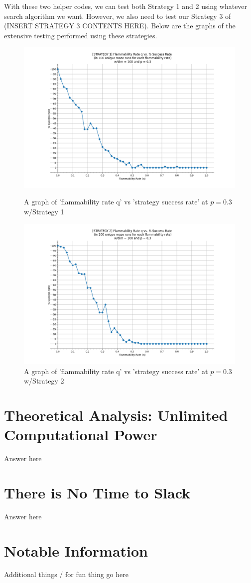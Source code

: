 \documentclass[11pt]{article}
\begin{document}
With these two helper codes, we can test both Strategy 1 and 2 using whatever search algorithm we want. However, we also need to test our Strategy 3 of (INSERT STRATEGY 3 CONTENTS HERE). Below are the graphs of the extensive testing performed using these strategies.
\begin{figure}[!]
\centering
\includegraphics[scale=0.50]{Strategy1_q_successRate.PNG}
\caption{A graph of 'flammability rate q' vs 'strategy success rate' at $p = 0.3$ w/Strategy 1}
\includegraphics[scale=0.50]{Strategy2_q_successRate.PNG}
\caption{A graph of 'flammability rate q' vs 'strategy success rate' at $p = 0.3$ w/Strategy 2}
\label{Strat1}
\end{figure}



\pagebreak
\section{Theoretical Analysis: Unlimited Computational Power}
Answer here
	\pagebreak
\section{There is No Time to Slack}
Answer here
	\pagebreak
\section{Notable Information}
Additional things / for fun thing go here
\end{document}
